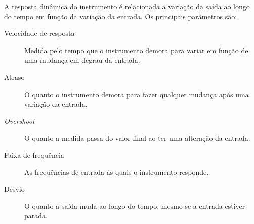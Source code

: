 A resposta dinâmica do instrumento é relacionada a variação da saída ao longo do tempo em função da variação da entrada. Os principais parâmetros são:
\begin{description}
  \item[Velocidade de resposta] Medida pelo tempo que o instrumento demora para variar em função de uma mudança em degrau da entrada.
  \item[Atraso] O quanto o instrumento demora para fazer qualquer mudança após uma variação da entrada.
  \item[\emph{Overshoot}] O quanto a medida passa do valor final ao ter uma alteração da entrada.
  \item [Faixa de frequência] As frequências de entrada às quais o instrumento responde.
  \item[Desvio] O quanto a saída muda ao longo do tempo, mesmo se a entrada estiver parada.
\end{description}


